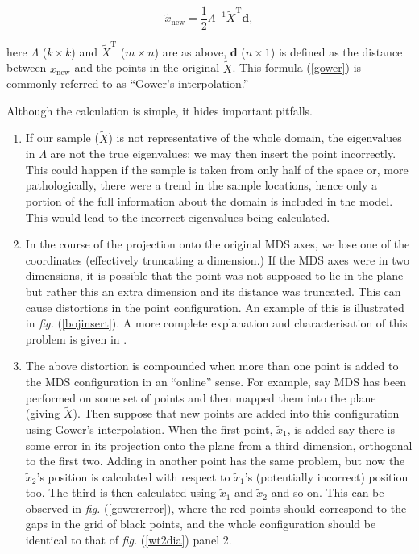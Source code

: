\documentclass[a4paper,10pt]{amsart}
\newcommand{\fig}[1]{\emph{fig.} (\ref{#1})}
\newcommand{\tr}[1]{#1^{\text{T}}}
\newcommand{\cross}{\times}
\begin{document}
\begin{equation}
\tilde{x}_{\text{new}} = \frac{1}{2} \Lambda^{-1} \tr{\tilde{X}} \mathbf{d},
\label{gower}
\end{equation}

here $\Lambda$ ($k \cross k$) and $\tr{\tilde{X}}$ ($m \cross n$) are as above, $\mathbf{d}$ ($n \cross 1$) is defined as the distance between $x_{\text{new}}$ and the points in the original $\tilde{X}$. This formula (\ref{gower}) is commonly referred to as ``Gower's interpolation.''

Although the calculation is simple, it hides important pitfalls. 

\begin{enumerate}
\item If our sample ($\tilde{X}$) is not representative of the whole domain, the eigenvalues in $\Lambda$ are not the true eigenvalues; we may then insert the point incorrectly. This could happen if the sample is taken from only half of the space or, more pathologically, there were a trend in the sample locations, hence only a portion of the full information about the domain is included in the model. This would lead to the incorrect eigenvalues being calculated.

\item In the course of the projection onto the original MDS axes, we lose one of the coordinates (effectively truncating a dimension.) If the MDS axes were in two dimensions, it is possible that the point was not supposed to lie in the plane but rather this an extra dimension and its distance was truncated. This can cause distortions in the point configuration. An example of this is illustrated in \fig{bojinsert}. A more complete explanation and characterisation of this problem is given in \cite{Boj2009}. 

\item The above distortion is compounded when more than one point is added to the MDS configuration in an ``online'' sense. For example, say MDS has been performed on some set of points and then mapped them into the plane (giving $\tilde{X}$). Then suppose that new points are added into this configuration using Gower's interpolation. When the first point, $\tilde{x}_1$, is added say there is some error in its projection onto the plane from a third dimension, orthogonal to the first two. Adding in another point has the same problem, but now the $\tilde{x}_2$'s position is calculated with respect to $\tilde{x}_1$'s (potentially incorrect) position too. The third is then calculated using $\tilde{x}_1$ and $\tilde{x}_2$ and so on. This can be observed in \fig{gowererror}, where the red points should correspond to the gaps in the grid of black points, and the whole configuration should be identical to that of \fig{wt2dia} panel 2. 

\end{enumerate}
\end{document}

